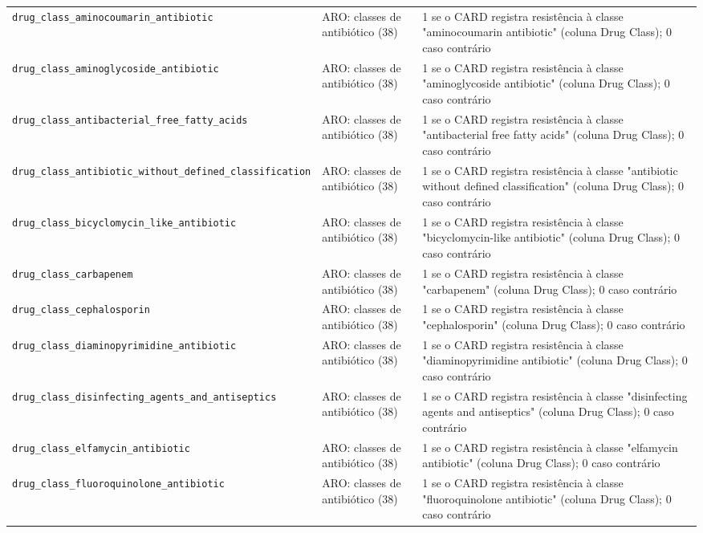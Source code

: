 \begin{longtable}{p{4.2cm}p{2.6cm}p{8cm}}
  \texttt{drug\_class\_aminocoumarin\_antibiotic} & ARO: classes de antibiótico (38) & 1 se o CARD registra resistência à classe "aminocoumarin antibiotic" (coluna Drug Class); 0 caso contrário \\
  \texttt{drug\_class\_aminoglycoside\_antibiotic} & ARO: classes de antibiótico (38) & 1 se o CARD registra resistência à classe "aminoglycoside antibiotic" (coluna Drug Class); 0 caso contrário \\
  \texttt{drug\_class\_antibacterial\_free\_fatty\_acids} & ARO: classes de antibiótico (38) & 1 se o CARD registra resistência à classe "antibacterial free fatty acids" (coluna Drug Class); 0 caso contrário \\
  \texttt{drug\_class\_antibiotic\_without\_defined\_classification} & ARO: classes de antibiótico (38) & 1 se o CARD registra resistência à classe "antibiotic without defined classification" (coluna Drug Class); 0 caso contrário \\
  \texttt{drug\_class\_bicyclomycin\_like\_antibiotic} & ARO: classes de antibiótico (38) & 1 se o CARD registra resistência à classe "bicyclomycin-like antibiotic" (coluna Drug Class); 0 caso contrário \\
  \texttt{drug\_class\_carbapenem} & ARO: classes de antibiótico (38) & 1 se o CARD registra resistência à classe "carbapenem" (coluna Drug Class); 0 caso contrário \\
  \texttt{drug\_class\_cephalosporin} & ARO: classes de antibiótico (38) & 1 se o CARD registra resistência à classe "cephalosporin" (coluna Drug Class); 0 caso contrário \\
  \texttt{drug\_class\_diaminopyrimidine\_antibiotic} & ARO: classes de antibiótico (38) & 1 se o CARD registra resistência à classe "diaminopyrimidine antibiotic" (coluna Drug Class); 0 caso contrário \\
  \texttt{drug\_class\_disinfecting\_agents\_and\_antiseptics} & ARO: classes de antibiótico (38) & 1 se o CARD registra resistência à classe "disinfecting agents and antiseptics" (coluna Drug Class); 0 caso contrário \\
  \texttt{drug\_class\_elfamycin\_antibiotic} & ARO: classes de antibiótico (38) & 1 se o CARD registra resistência à classe "elfamycin antibiotic" (coluna Drug Class); 0 caso contrário \\
  \texttt{drug\_class\_fluoroquinolone\_antibiotic} & ARO: classes de antibiótico (38) & 1 se o CARD registra resistência à classe "fluoroquinolone antibiotic" (coluna Drug Class); 0 caso contrário \\

\end{longtable}
